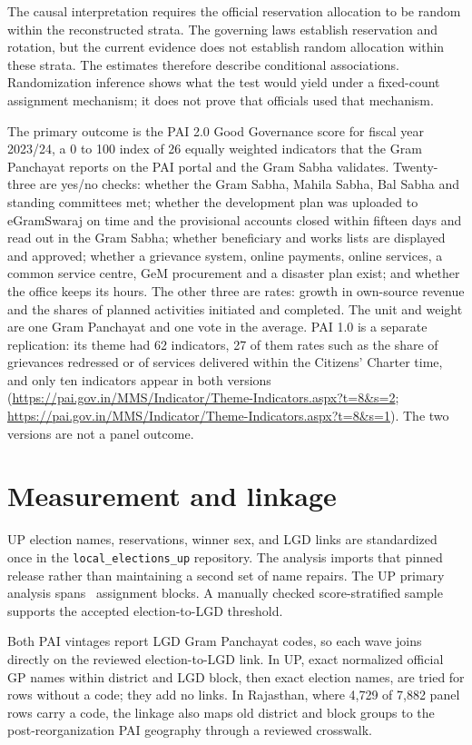 \documentclass[12pt]{article}
\begin{document}
The causal interpretation requires the official reservation allocation to be random within the reconstructed strata. The governing laws establish reservation and rotation, but the current evidence does not establish random allocation within these strata. The estimates therefore describe conditional associations. Randomization inference shows what the test would yield under a fixed-count assignment mechanism; it does not prove that officials used that mechanism.

The primary outcome is the PAI 2.0 Good Governance score for fiscal year 2023/24, a 0 to 100 index of 26 equally weighted indicators that the Gram Panchayat reports on the PAI portal and the Gram Sabha validates. Twenty-three are yes/no checks: whether the Gram Sabha, Mahila Sabha, Bal Sabha and standing committees met; whether the development plan was uploaded to eGramSwaraj on time and the provisional accounts closed within fifteen days and read out in the Gram Sabha; whether beneficiary and works lists are displayed and approved; whether a grievance system, online payments, online services, a common service centre, GeM procurement and a disaster plan exist; and whether the office keeps its hours. The other three are rates: growth in own-source revenue and the shares of planned activities initiated and completed. The unit and weight are one Gram Panchayat and one vote in the average. PAI 1.0 is a separate replication: its theme had 62 indicators, 27 of them rates such as the share of grievances redressed or of services delivered within the Citizens' Charter time, and only ten indicators appear in both versions (\url{https://pai.gov.in/MMS/Indicator/Theme-Indicators.aspx?t=8&s=2}; \url{https://pai.gov.in/MMS/Indicator/Theme-Indicators.aspx?t=8&s=1}). The two versions are not a panel outcome.

\section{Measurement and linkage}

UP election names, reservations, winner sex, and LGD links are standardized once in the \texttt{local\_elections\_up} repository. The analysis imports that pinned release rather than maintaining a second set of name repairs. The UP primary analysis spans \UpPaiTwoBlocks\ assignment blocks. A manually checked score-stratified sample supports the accepted election-to-LGD threshold.

Both PAI vintages report LGD Gram Panchayat codes, so each wave joins directly on the reviewed election-to-LGD link. In UP, exact normalized official GP names within district and LGD block, then exact election names, are tried for rows without a code; they add no links. In Rajasthan, where 4,729 of 7,882 panel rows carry a code, the linkage also maps old district and block groups to the post-reorganization PAI geography through a reviewed crosswalk.
\end{document}
